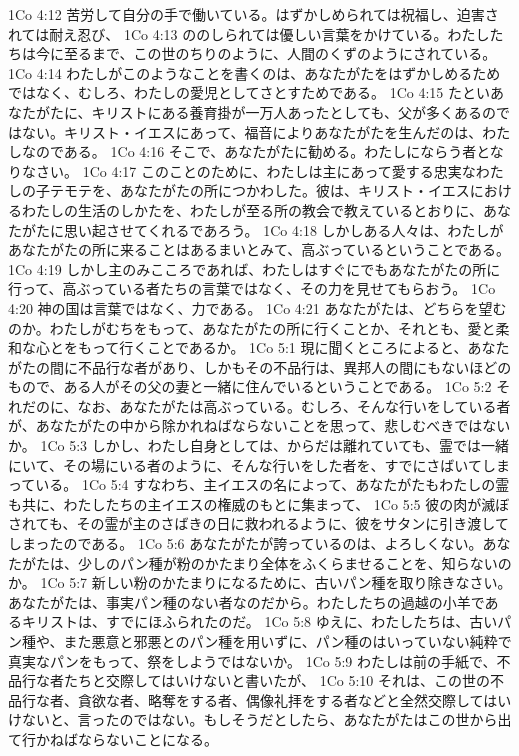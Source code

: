 1Co 4:12  苦労して自分の手で働いている。はずかしめられては祝福し、迫害されては耐え忍び、
1Co 4:13  ののしられては優しい言葉をかけている。わたしたちは今に至るまで、この世のちりのように、人間のくずのようにされている。
1Co 4:14  わたしがこのようなことを書くのは、あなたがたをはずかしめるためではなく、むしろ、わたしの愛児としてさとすためである。
1Co 4:15  たといあなたがたに、キリストにある養育掛が一万人あったとしても、父が多くあるのではない。キリスト・イエスにあって、福音によりあなたがたを生んだのは、わたしなのである。
1Co 4:16  そこで、あなたがたに勧める。わたしにならう者となりなさい。
1Co 4:17  このことのために、わたしは主にあって愛する忠実なわたしの子テモテを、あなたがたの所につかわした。彼は、キリスト・イエスにおけるわたしの生活のしかたを、わたしが至る所の教会で教えているとおりに、あなたがたに思い起させてくれるであろう。
1Co 4:18  しかしある人々は、わたしがあなたがたの所に来ることはあるまいとみて、高ぶっているということである。
1Co 4:19  しかし主のみこころであれば、わたしはすぐにでもあなたがたの所に行って、高ぶっている者たちの言葉ではなく、その力を見せてもらおう。
1Co 4:20  神の国は言葉ではなく、力である。
1Co 4:21  あなたがたは、どちらを望むのか。わたしがむちをもって、あなたがたの所に行くことか、それとも、愛と柔和な心とをもって行くことであるか。
1Co 5:1  現に聞くところによると、あなたがたの間に不品行な者があり、しかもその不品行は、異邦人の間にもないほどのもので、ある人がその父の妻と一緒に住んでいるということである。
1Co 5:2  それだのに、なお、あなたがたは高ぶっている。むしろ、そんな行いをしている者が、あなたがたの中から除かれねばならないことを思って、悲しむべきではないか。
1Co 5:3  しかし、わたし自身としては、からだは離れていても、霊では一緒にいて、その場にいる者のように、そんな行いをした者を、すでにさばいてしまっている。
1Co 5:4  すなわち、主イエスの名によって、あなたがたもわたしの霊も共に、わたしたちの主イエスの権威のもとに集まって、
1Co 5:5  彼の肉が滅ぼされても、その霊が主のさばきの日に救われるように、彼をサタンに引き渡してしまったのである。
1Co 5:6  あなたがたが誇っているのは、よろしくない。あなたがたは、少しのパン種が粉のかたまり全体をふくらませることを、知らないのか。
1Co 5:7  新しい粉のかたまりになるために、古いパン種を取り除きなさい。あなたがたは、事実パン種のない者なのだから。わたしたちの過越の小羊であるキリストは、すでにほふられたのだ。
1Co 5:8  ゆえに、わたしたちは、古いパン種や、また悪意と邪悪とのパン種を用いずに、パン種のはいっていない純粋で真実なパンをもって、祭をしようではないか。
1Co 5:9  わたしは前の手紙で、不品行な者たちと交際してはいけないと書いたが、
1Co 5:10  それは、この世の不品行な者、貪欲な者、略奪をする者、偶像礼拝をする者などと全然交際してはいけないと、言ったのではない。もしそうだとしたら、あなたがたはこの世から出て行かねばならないことになる。
